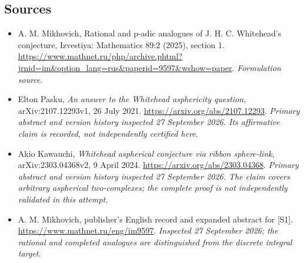 \documentclass[11pt]{article}
\begin{document}
\subsection{Sources}
\begin{itemize}
\item[S1]A. M. Mikhovich, Rational and p-adic analogues of J. H. C. Whitehead's conjecture, Izvestiya: Mathematics 89:2 (2025), section 1.
\url{https://www.mathnet.ru/php/archive.phtml?jrnid=im&option_lang=rus&paperid=9597&wshow=paper}.
\textit{Formulation source.}
\item[E1]Elton Pasku, \emph{An answer to the Whitehead asphericity
question}, arXiv:2107.12293v1, 26 July 2021.
\url{https://arxiv.org/abs/2107.12293}.
\textit{Primary abstract and version history inspected 27 September 2026.
Its affirmative claim is recorded, not independently certified here.}
\item[E2]Akio Kawauchi, \emph{Whitehead aspherical conjecture via ribbon
sphere-link}, arXiv:2303.04368v2, 9 April 2024.
\url{https://arxiv.org/abs/2303.04368}.
\textit{Primary abstract and version history inspected 27 September 2026.
The claim covers arbitrary aspherical two-complexes; the complete proof
is not independently validated in this attempt.}
\item[E3]A. M. Mikhovich, publisher's English record and expanded abstract
for [S1]. \url{https://www.mathnet.ru/eng/im9597}.
\textit{Inspected 27 September 2026; the rational and completed analogues
are distinguished from the discrete integral target.}
\end{itemize}
\end{document}
